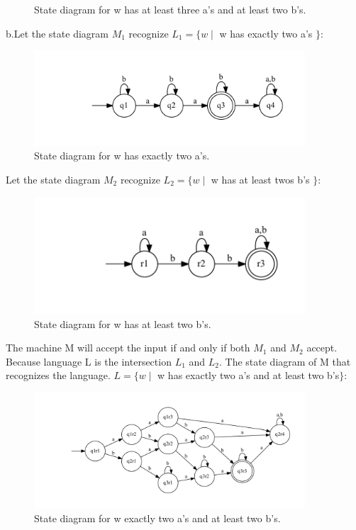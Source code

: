 \documentclass[10pt] {article}
\begin{document}
\begin{enumerate}
\begin{figure}[H]
\caption{State diagram for w has at least three a's and at least two b's.}
\label{3}
\end{figure}
b.Let the state diagram $M_1$ recognize 
$L_1 = \{ w \mid$ w has exactly two a's $\}$:
\begin{figure}[H]
\includegraphics[width=0.9\textwidth]{ba14.pdf}
\caption{State diagram for w has exactly two a's.}
\label{4}
\end{figure} 
Let the state diagram $M_2$ recognize 
$L_2 = \{ w \mid$ w has at least twos b's $\}$:
\begin{figure}[H]
\includegraphics[width=0.9\textwidth]{ab14.pdf}
\caption{State diagram for w has at least two b's.}
\label{5}
\end{figure}
The machine M will accept the input if and only if both $M_1$ and $M_2$ accept. Because language L is the intersection $L_1$ and $L_2$.
The state diagram of M that recognizes the language. $L = \{ w \mid$ w has exactly two a's and at least two b's$\}$: 
\begin{figure}[H]
\includegraphics[width=0.9\textwidth]{bb14.pdf}
\caption{State diagram for w exactly two a's and at least two b's.}

\end{figure}
\end{enumerate}
\end{document}
